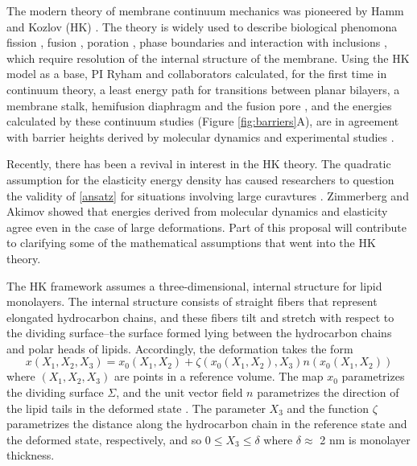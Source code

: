 The modern theory of membrane continuum mechanics
was pioneered by Hamm and Kozlov (HK) \cite{Hamm2000}.
The theory is widely used to describe biological phenomona 
fission \cite{FrEsAkSh15, Maetal15, PhysRevE.79.031926},
fusion \cite{KoKo2002,10.1073/pnas.121191898,10.1073/pnas.1119442109} ,
poration \cite{10.1016/j.bpj.2019.11.2221}, phase boundaries and interaction with inclusions
\cite{https://doi.org/10.1038/nrm.2017.16,10.1016/j.bpj.2019.11.2209, https://doi.org/10.1038/s41598-020-61110-2}, which require resolution of the internal structure of the membrane.  
Using the HK  model as a base,
PI Ryham and collaborators calculated, for the first time in continuum theory, a least energy path for transitions between planar bilayers, a membrane stalk,
hemifusion diaphragm and the fusion pore \cite{RyWaCo13, RyKlYaCo16},
and the energies calculated by these continuum studies (Figure \ref{fig:barriers}A),
are in agreement with barrier heights derived by molecular dynamics and experimental studies \cite{FrRoPi17}.  

Recently, there has been a revival in interest in the HK theory. The quadratic assumption
for the elasticity energy density has caused researchers to question the validity of \eqref{ansatz}
for situations involving large curavtures \cite{PRL, https://doi.org/10.1016/j.bbamem.2016.02.003}. Zimmerberg and Akimov \cite{https://doi.org/10.1039/C9SM02079A}
showed that energies derived from molecular dynamics and elasticity agree even in the case of large deformations.
Part of this proposal will contribute to clarifying some of the mathematical
assumptions that went into the HK theory. 


The HK framework assumes a three-dimensional, internal structure for lipid monolayers.
The internal structure consists of straight fibers that represent elongated hydrocarbon chains, and these fibers
tilt and stretch with respect to the dividing surface--the surface formed lying between the hydrocarbon chains and polar heads of lipids.
Accordingly, the deformation takes the form 
\begin{equation}
  \label{LMdeformation}
x(X_1, X_2, X_3) = x_0(X_1, X_2) + \zeta(x_0(X_1, X_2), X_3) n(x_0(X_1, X_2))
\end{equation}
where $(X_1,X_2,X_3)$ are points in a reference volume.
The map $x_0$ parametrizes the dividing surface $\Sigma$, and the unit vector field $n$ parametrizes the
direction of the lipid tails in the deformed state \cite{doi:10.1021/jp075641w,KLAUDA20083074}.
The parameter $X_3$ and the function $\zeta$ parametrizes the distance along the hydrocarbon chain in the reference state
and the deformed state, respectively, and so $0 \leq X_3 \leq \delta$ where $\delta \approx $ 2 nm is monolayer thickness. 

